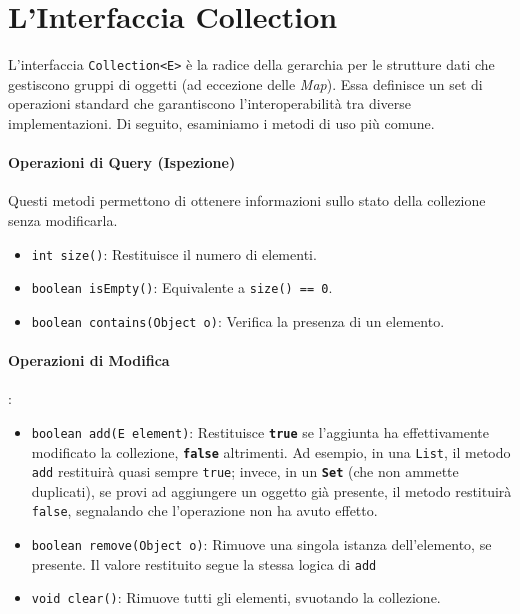 \section{L'Interfaccia Collection}

L'interfaccia \texttt{Collection<E>} è la radice della gerarchia per le strutture dati che gestiscono gruppi di oggetti (ad eccezione delle \textit{Map}). Essa definisce un set di operazioni standard che garantiscono l'interoperabilità tra diverse implementazioni. Di seguito, esaminiamo i metodi di uso più comune. 

\paragraph{Operazioni di Query (Ispezione)}

Questi metodi permettono di ottenere informazioni sullo stato della collezione senza modificarla.

\begin{itemize}
    \item \texttt{int size()}: Restituisce il numero di elementi.
    \item \texttt{boolean isEmpty()}: Equivalente a \texttt{size() == 0}.
    \item \texttt{boolean contains(Object o)}: Verifica la presenza di un elemento. 
\end{itemize}


\paragraph{Operazioni di Modifica}
:

\begin{itemize}
    \item \texttt{boolean add(E element)}: Restituisce \textbf{\texttt{true}} se l'aggiunta ha effettivamente modificato la collezione, \textbf{\texttt{false}} altrimenti. Ad esempio, in una \texttt{List}, il metodo \texttt{add} restituirà quasi sempre \texttt{true}; invece, in un \textbf{\texttt{Set}} (che non ammette duplicati), se provi ad aggiungere un oggetto già presente, il metodo restituirà \texttt{false}, segnalando che l'operazione non ha avuto effetto.
    \item \texttt{boolean remove(Object o)}: Rimuove una singola istanza dell'elemento, se presente. Il valore restituito segue la stessa logica di \texttt{add}
    \item \texttt{void clear()}: Rimuove tutti gli elementi, svuotando la collezione.
\end{itemize}

